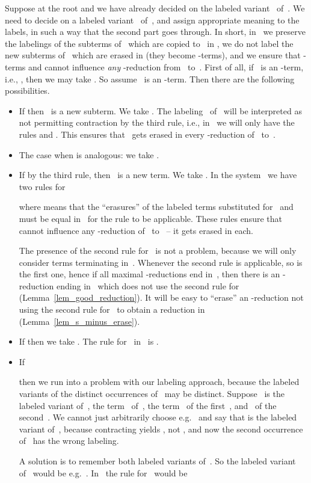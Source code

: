 \documentclass[a4paper,UKenglish]{lipics-v2016}
\begin{document}
Suppose  at the root and we have
already decided on the labeled variant~ of~. We need to decide
on a labeled variant~ of~, and assign appropriate meaning to
the labels, in such a way that the second part goes through. In short,
in~ we preserve the labelings of the subterms of~ which are
copied to~ in , we do not label the new subterms
of~ which are erased in  (they become
-terms), and we ensure that -terms and cannot influence
\emph{any} -reduction from~ to~. First of all, if~ is
an -term, i.e., , then we may take . So
assume~ is an -term. Then there are the following possibilities.
\begin{itemize}
\item If  then~ is a new
  subterm. We take . The labeling~
  of~ will be interpreted as not permitting contraction by the
  third rule, i.e., in~ we will only have the rules
   and . This ensures
  that~ gets erased in every -reduction of~ to~.
\item The case when  is
  analogous: we take .
\item If  by the third rule,
  then~ is a new term. We take . In the
  system~ we have two rules for~
  
  where  means that the ``erasures'' of
  the labeled terms substituted for~ and~ must be equal
  in~ for the rule to be applicable. These rules ensure
  that~ cannot influence any -reduction of~ to~ --
  it gets erased in each.

  The presence of the second rule for~ is not a problem,
  because we will only consider terms terminating in~. Whenever
  the second rule is applicable, so is the first one, hence if all
  maximal -reductions end in~, then there is an
  -reduction ending in~ which does not use the second rule
  for~ (Lemma~\ref{lem_good_reduction}). It will be easy to
  ``erase'' an -reduction not using the second rule for~ to
  obtain a reduction in~ (Lemma~\ref{lem_s_minus_erase}).
\item If  then we take
  . The rule for~ in~ is
  .
\item If
  
  then we run into a problem with our labeling approach, because the
  labeled variants of the distinct occurrences of~ may be
  distinct. Suppose~ is the labeled variant of~, the
  term~ of~, the term~ of the first~, and~
  of the second~. We cannot just arbitrarily choose e.g.~
  and say that  is the labeled variant of~,
  because contracting  yields ,
  not , and now the second occurrence of~ has
  the wrong labeling.

  A solution is to remember both labeled variants of~. So the
  labeled variant of~ would be
  e.g.~. In~ the rule
  for~ would be
  

\end{itemize}
\end{document}
